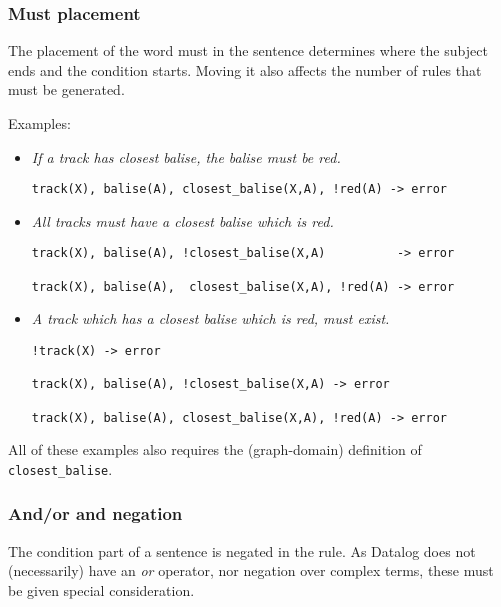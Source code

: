 \documentclass[]{article}
\begin{document}
\subsubsection{Must placement}\label{must-placement}

The placement of the word must in the sentence determines where the
subject ends and the condition starts. Moving it also affects the number
of rules that must be generated.

Examples:

\begin{itemize}
\item
  \emph{If a track has closest balise, the balise must be red.}

\begin{verbatim}
track(X), balise(A), closest_balise(X,A), !red(A) -> error
\end{verbatim}
\item
  \emph{All tracks must have a closest balise which is red.}

\begin{verbatim}
track(X), balise(A), !closest_balise(X,A)          -> error

track(X), balise(A),  closest_balise(X,A), !red(A) -> error
\end{verbatim}
\item
  \emph{A track which has a closest balise which is red, must exist.}

\begin{verbatim}
!track(X) -> error

track(X), balise(A), !closest_balise(X,A) -> error

track(X), balise(A), closest_balise(X,A), !red(A) -> error
\end{verbatim}
\end{itemize}

All of these examples also requires the (graph-domain) definition of
\texttt{closest\_balise}.

\subsubsection{And/or and negation}\label{andor-and-negation}

The condition part of a sentence is negated in the rule. As Datalog does
not (necessarily) have an \emph{or} operator, nor negation over complex
terms, these must be given special consideration.
\end{document}
